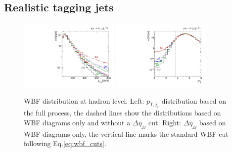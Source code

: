 \subsection{Realistic tagging jets}

\begin{figure}[t]
  \includegraphics[width=0.43\textwidth]{fig/validity/WBF_realistic_T1_j1pt.pdf}
  \hspace*{0.05\textwidth}
  \includegraphics[width=0.43\textwidth]{fig/validity/WBF_realistic_T1_deltaEtaJJ.pdf}
  \caption{WBF distribution at hadron level. Left: $p_{T,j_1}$
    distribution based on the full process, the dashed lines show the
    distributions based on WBF diagrams only and without a
    $\Delta \eta_{jj}$ cut. Right: $\Delta \eta_{jj}$ based on WBF
    diagrams only, the vertical line marks the standard WBF cut
    following Eq.\;\eqref{eq:wbf_cuts}.}
  \label{fig:validity_realistic_jets}
\end{figure}

